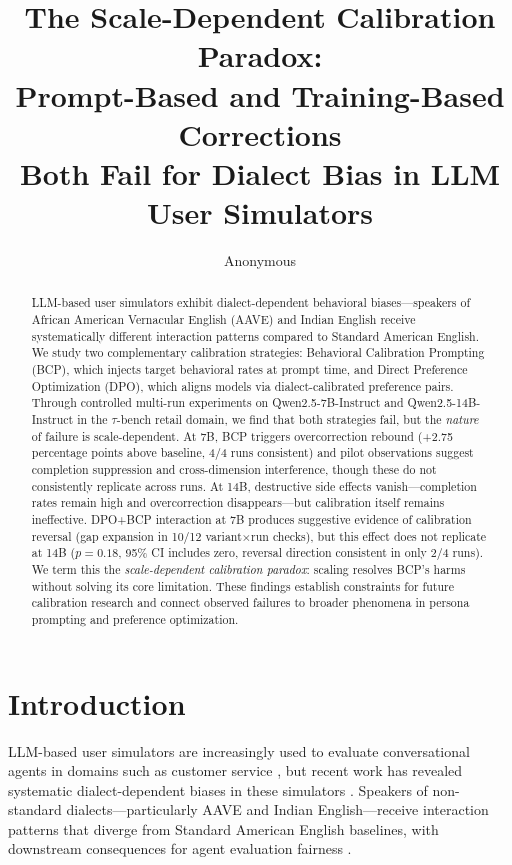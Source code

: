 \documentclass[11pt]{article}
\title{The Scale-Dependent Calibration Paradox:\\Prompt-Based and Training-Based Corrections\\Both Fail for Dialect Bias in LLM User Simulators}
\author{Anonymous}
\date{}
\begin{document}
\maketitle

\begin{abstract}
LLM-based user simulators exhibit dialect-dependent behavioral biases---speakers of African American Vernacular English (AAVE) and Indian English receive systematically different interaction patterns compared to Standard American English.
We study two complementary calibration strategies: Behavioral Calibration Prompting (BCP), which injects target behavioral rates at prompt time, and Direct Preference Optimization (DPO), which aligns models via dialect-calibrated preference pairs.
Through controlled multi-run experiments on Qwen2.5-7B-Instruct and Qwen2.5-14B-Instruct in the $\tau$-bench retail domain, we find that both strategies fail, but the \emph{nature} of failure is scale-dependent.
At 7B, BCP triggers overcorrection rebound (+2.75 percentage points above baseline, 4/4 runs consistent) and pilot observations suggest completion suppression and cross-dimension interference, though these do not consistently replicate across runs.
At 14B, destructive side effects vanish---completion rates remain high and overcorrection disappears---but calibration itself remains ineffective.
DPO+BCP interaction at 7B produces suggestive evidence of calibration reversal (gap expansion in 10/12 variant$\times$run checks), but this effect does not replicate at 14B ($p=0.18$, 95\% CI includes zero, reversal direction consistent in only 2/4 runs).
We term this the \emph{scale-dependent calibration paradox}: scaling resolves BCP's harms without solving its core limitation.
These findings establish constraints for future calibration research and connect observed failures to broader phenomena in persona prompting and preference optimization.
\end{abstract}

\section{Introduction}
\label{sec:intro}

LLM-based user simulators are increasingly used to evaluate conversational agents in domains such as customer service \citep{yao2024taubench}, but recent work has revealed systematic dialect-dependent biases in these simulators \citep{seshadri2026lost}.
Speakers of non-standard dialects---particularly AAVE and Indian English---receive interaction patterns that diverge from Standard American English baselines, with downstream consequences for agent evaluation fairness \citep{sim2real2026gap}.
\end{document}
